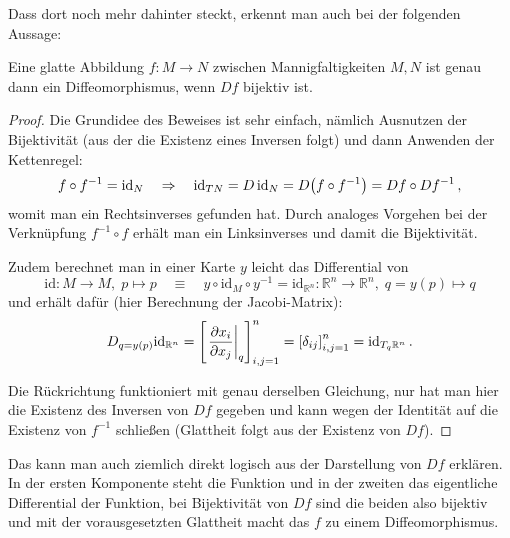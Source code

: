 \documentclass[../H_Analysis_main.tex]{subfiles}
\begin{document}
Dass dort noch mehr dahinter steckt, erkennt man auch bei der folgenden Aussage:
\begin{satz}
Eine glatte Abbildung $f: M \rightarrow N$ zwischen Mannigfaltigkeiten $M, N$ ist genau dann ein Diffeomorphismus, wenn $Df$ bijektiv ist.
\end{satz}
\begin{proof}
Die Grundidee des Beweises ist sehr einfach, nämlich Ausnutzen der Bijektivität (aus der die Existenz eines Inversen folgt) und dann Anwenden der Kettenregel:
\begin{equation}
f \circ f^{-1} = \text{id}_N \quad \Rightarrow \quad \text{id}_{TN} = D \, \text{id}_N = D \qty(f \circ f^{-1}) = Df \circ Df^{-1} \, ,
\end{equation}
womit man ein Rechtsinverses gefunden hat. Durch analoges Vorgehen bei der Verknüpfung $f^{-1} \circ f$ erhält man ein Linksinverses und damit die Bijektivität.

Zudem berechnet man in einer Karte $y$ leicht das Differential von
\begin{equation*}
\text{id}: M \rightarrow M, \; p \mapsto p \quad \equiv \quad y \circ \text{id}_M \circ y^{-1} = \text{id}_{\mathbb{R}^n}: \mathbb{R}^n \rightarrow \mathbb{R}^n, \; q = y(p) \mapsto q
\end{equation*}
und erhält dafür (hier Berechnung der Jacobi-Matrix):
\begin{equation}
D_{q = y(p)} \text{id}_{\mathbb{R}^n} = \qty[\eval{\pdv{x_i}{x_j}}_q]_{i, j = 1}^n = \qty[\delta_{ij}]_{i, j = 1}^n = \text{id}_{T_q \mathbb{R}^n} \, .
\end{equation}

Die Rückrichtung funktioniert mit genau derselben Gleichung, nur hat man hier die Existenz des Inversen von $Df$ gegeben und kann wegen der Identität auf die Existenz von $f^{-1}$ schließen (Glattheit folgt aus der Existenz von $Df$).
\end{proof}
Das kann man auch ziemlich direkt logisch aus der Darstellung von $Df$ erklären. In der ersten Komponente steht die Funktion und in der zweiten das eigentliche Differential der Funktion, bei Bijektivität von $Df$ sind die beiden also bijektiv und mit der vorausgesetzten Glattheit macht das $f$ zu einem Diffeomorphismus.
\end{document}

